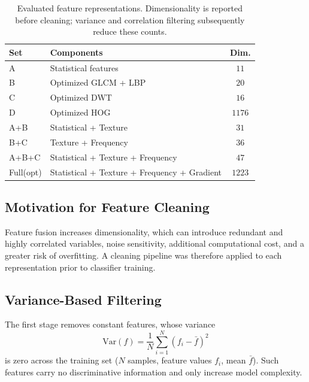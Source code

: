 \begin{table}[t]
\centering
\caption{Evaluated feature representations. Dimensionality is reported before
cleaning; variance and correlation filtering subsequently reduce these counts.}
\label{tab:featuresets}
\renewcommand{\arraystretch}{1.2}
\begin{tabular}{@{}llc@{}}
\toprule
\textbf{Set} & \textbf{Components} & \textbf{Dim.} \\
\midrule
A            & Statistical features                         & $11$   \\
B            & Optimized GLCM + LBP                          & $20$   \\
C            & Optimized DWT                                 & $16$   \\
D            & Optimized HOG                                 & $1176$ \\
A+B          & Statistical + Texture                         & $31$   \\
B+C          & Texture + Frequency                           & $36$   \\
A+B+C        & Statistical + Texture + Frequency             & $47$   \\
Full(opt)    & Statistical + Texture + Frequency + Gradient  & $1223$ \\
\bottomrule
\end{tabular}
\end{table}

\subsection{Motivation for Feature Cleaning}
\label{sec:feat_cleaning}

Feature fusion increases dimensionality, which can introduce redundant and highly
correlated variables, noise sensitivity, additional computational cost, and a
greater risk of overfitting. A cleaning pipeline was therefore applied to each
representation prior to classifier training.

\subsection{Variance-Based Filtering}

The first stage removes constant features, whose variance
\begin{equation}
\mathrm{Var}(f) = \frac{1}{N}\sum_{i=1}^{N}(f_i - \bar{f})^2
\end{equation}
is zero across the training set ($N$ samples, feature values $f_i$, mean
$\bar{f}$). Such features carry no discriminative information and only increase
model complexity.

